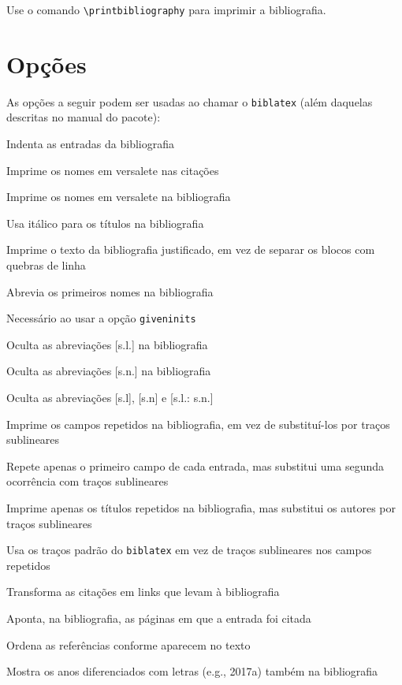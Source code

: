 \documentclass[a4paper]{article}
\begin{document}
Use o comando \verb"\printbibliography" para imprimir a bibliografia.

\clearpage
\section{Opções}%
\label{sec:opções}

As opções a seguir podem ser usadas ao chamar o \texttt{biblatex} (além daquelas descritas no manual do pacote):

\begin{description}[itemindent=-1em,leftmargin=3em]%
  \item [indent] Indenta as entradas da bibliografia
  \item [sccite] Imprime os nomes em versalete nas citações
  \item [scbib] Imprime os nomes em versalete na bibliografia
  \item [ittitles] Usa itálico para os títulos na bibliografia
  \item [block=none] Imprime o texto da bibliografia justificado, em vez de separar os blocos com quebras de linha
  \item [giveninits] Abrevia os primeiros nomes na bibliografia
  \item [uniquename=init] Necessário ao usar a opção \texttt{giveninits}
  \item [nosl] Oculta as abreviações [s.l.] na bibliografia
  \item [nosn] Oculta as abreviações [s.n.] na bibliografia
  \item [noslsn] Oculta as abreviações [s.l], [s.n] e [s.l.: s.n.]
  \item [repeatfields] Imprime os campos repetidos na bibliografia, em vez de
    substituí-los por traços sublineares
  \item [repeatfirstfields] Repete apenas o primeiro campo de cada entrada,
    mas substitui uma segunda ocorrência com traços sublineares
  \item [repeattitles] Imprime apenas os títulos repetidos na bibliografia,
    mas substitui os autores por traços sublineares
  \item [usedashes] Usa os traços padrão do \texttt{biblatex} em vez de
    traços sublineares nos campos repetidos
  \item [hyperref] Transforma as citações em links que levam à bibliografia
  \item [backref] Aponta, na bibliografia, as páginas em que a entrada foi
    citada
  \item [sorting=none] Ordena as referências conforme aparecem no texto
  \item [extrayear] Mostra os anos diferenciados com letras (e.g., 2017a) também na bibliografia
\end{description}%
\end{document}
